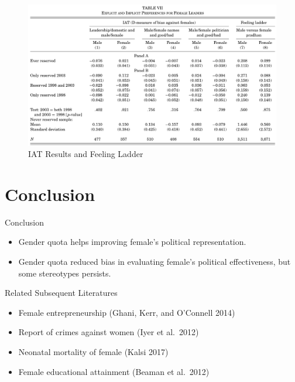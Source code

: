 \documentclass[
  10pt,
  ignorenonframetext,
  aspectratio=43,
]{beamer}
\providecommand{\tightlist}{%
  \setlength{\itemsep}{0pt}\setlength{\parskip}{0pt}}
\begin{document}
\begin{frame}
\begin{figure}
\centering
\includegraphics{20220523-qje-beaman-duflo-powerful-women.assets/table7-IAT results.png}
\caption{IAT Results and Feeling Ladder}
\end{figure}
\end{frame}

\hypertarget{conclusion}{%
\section{Conclusion}\label{conclusion}}

\begin{frame}{Conclusion}
\begin{itemize}
\tightlist
\item
  Gender quota helps improving female's political representation.
\item
  Gender quota reduced bias in evaluating female's political
  effectiveness, but some stereotypes persists.
\end{itemize}

\begin{block}{Related Subsequent Literatures}
\protect\hypertarget{related-subsequent-literatures}{}
\begin{itemize}
\tightlist
\item
  Female entrepreneurship \footnotesize (Ghani, Kerr, and O'Connell
  2014) \normalsize
\item
  Report of crimes against women \footnotesize (Iyer et al.~2012)
  \normalsize
\item
  Neonatal mortality of female \footnotesize (Kalsi 2017) \normalsize
\item
  Female educational attainment \footnotesize (Beaman et al.~2012)
  \normalsize
\end{itemize}
\end{block}
\end{frame}
\end{document}

